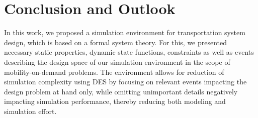 \documentclass[graybox]{svmult}
\begin{document}
\section{Conclusion and Outlook}
\label{sec:con}
In this work, we proposed a simulation environment for transportation system design, which is based on a formal system theory. For this, we presented necessary static properties, dynamic state functions, constraints as well as events describing the design space of our simulation environment in the scope of mobility-on-demand problems. The environment allows for reduction of simulation complexity using DES by focusing on relevant events impacting the design problem at hand only, while omitting unimportant details negatively impacting simulation performance, thereby reducing both modeling and simulation effort.
\vspace{-2mm}



\end{document}
